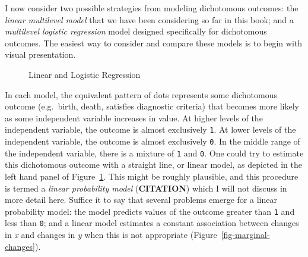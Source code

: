 \documentclass[
  letterpaper,
  DIV=11,
  numbers=noendperiod]{scrreprt}
\begin{document}
I now consider two possible strategies from modeling dichotomous
outcomes: the \emph{linear multilevel model} that we have been
considering so far in this book; and a \emph{multilevel logistic
regression} model designed specifically for dichotomous outcomes. The
easiest way to consider and compare these models is to begin with visual
presentation.

\begin{figure}


\caption{\label{fig-linear-logistic}Linear and Logistic Regression}

\end{figure}%

In each model, the equivalent pattern of dots represents some
dichotomous outcome (e.g.~birth, death, satisfies diagnostic criteria)
that becomes more likely as some independent variable increases in
value. At higher levels of the independent variable, the outcome is
almost exclusively \texttt{1}. At lower levels of the independent
variable, the outcome is almost exclusively \texttt{0}. In the middle
range of the independent variable, there is a mixture of \texttt{1} and
\texttt{0}. One could try to estimate this dichotomous outcome with a
straight line, or linear model, as depicted in the left hand panel of
Figure~\ref{fig-linear-logistic}. This might be roughly plausible, and
this procedure is termed a \emph{linear probability model}
(\textbf{CITATION}) which I will not discuss in more detail here.
Suffice it to say that several problems emerge for a linear probability
model: the model predicts values of the outcome greater than \texttt{1}
and less than \texttt{0}; and a linear model estimates a constant
association between changes in \emph{x} and changes in \emph{y} when
this is not appropriate (Figure~\ref{fig-marginal-changes}).
\end{document}
